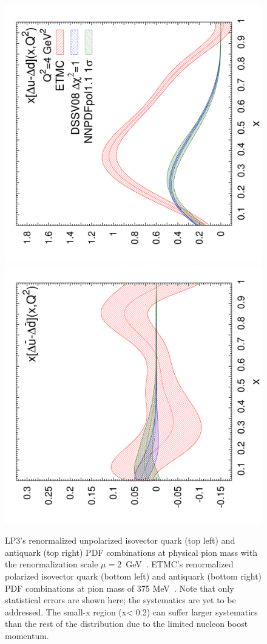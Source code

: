 \begin{figure}[!t]
\includegraphics[scale=0.22,angle=270]{plots/polxq}
\includegraphics[scale=0.22,angle=270]{plots/polxqbar}\\
\caption{\small LP3's renormalized unpolarized isovector quark (top left) and 
  antiquark (top right) PDF combinations at physical pion mass with the renormalization scale 
  $\mu=2$~GeV~\cite{Lin:2017ani}. 
  ETMC's renormalized polarized isovector quark (bottom left) and antiquark
  (bottom right) PDF combinations at pion mass of 
  375 MeV~\cite{Alexandrou:2017huk}.
  Note that only statistical errors are shown here; the systematics are yet to be addressed. The small-x region (x< 0.2) can suffer larger systematics than the rest of the distribution due to the limited nucleon boost momentum.
  } 
\label{fig:qPDF-demo}
\end{figure}
